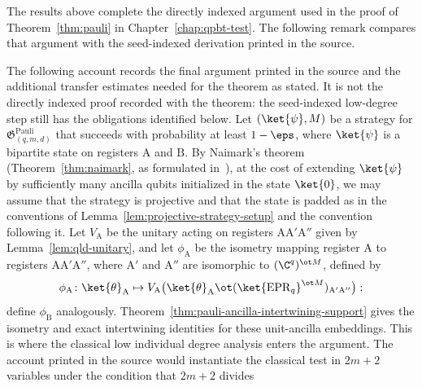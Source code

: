 The results above complete the directly indexed argument used in the proof of
Theorem~\ref{thm:pauli} in Chapter~\ref{chap:qpbt-test}. The following remark
compares that argument with the seed-indexed derivation printed in the source.

\begin{remark}
	\label{rem:pauli-printed-seed-argument}
	The following account records the final argument printed in the source and
	the additional transfer estimates needed for the theorem as stated. It is
	not the directly indexed proof recorded with the theorem: the seed-indexed
	low-degree step still has the obligations identified below.
	Let $(\ket{\psi},M)$ be a strategy for $\mathfrak{G}^{\mathrm{Pauli}}_{(q,m,d)}$ that succeeds with probability at least $1 - \eps$, where $\ket{\psi}$ is a bipartite state on registers $\mathrm{A}$ and $\mathrm{B}$. By Naimark's theorem (Theorem~\ref{thm:naimark}, as formulated in~\cite[Theorem 5.1]{Ji2020LowIndividualDegree}), at the cost of extending $\ket{\psi}$ by sufficiently many ancilla qubits initialized in the state $\ket{0}$, we may assume that the strategy is projective and that the state is padded as in the conventions of Lemma~\ref{lem:projective-strategy-setup} and the convention following it. Let $V_{\mathrm{A}}$ be the unitary acting on registers $\mathrm{A}\mathrm{A}'\mathrm{A}''$ given by Lemma~\ref{lem:qld-unitary}, and let $\phi_{\mathrm{A}}$ be the isometry mapping register $\mathrm{A}$ to registers $\mathrm{A}\mathrm{A}'\mathrm{A}''$, where $\mathrm{A}'$ and $\mathrm{A}''$ are isomorphic to $(\C^q)^{\ot M}$, defined by
	\[
		\phi_{\mathrm{A}}\colon \ket{\theta}_{\mathrm{A}} \mapsto V_{\mathrm{A}} \bigl(\ket{\theta}_{\mathrm{A}} \ot (\ket{\mathrm{EPR}_q}^{\ot M})_{\mathrm{A}' \mathrm{A}''}\bigr)\;;
	\]
	define $\phi_{\mathrm{B}}$ analogously.
	Theorem~\ref{thm:pauli-ancilla-intertwining-support} gives the isometry and
	exact intertwining identities for these unit-ancilla embeddings.
	This is where the classical low individual degree analysis enters the
	argument. The account printed in the source would instantiate the
	classical test in $2m+2$ variables under the condition that $2m+2$ divides

\end{remark}
